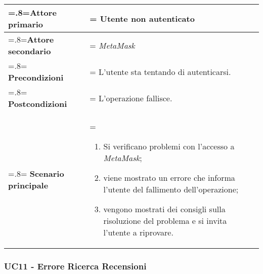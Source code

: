             \begin{center}
                \renewcommand{\arraystretch}{1.5}
                \renewcommand\tabularxcolumn[1]{m{#1}}
                \begin{tabularx}{0.9\textwidth} {
                    >{\hsize=.8\hsize\linewidth=\hsize}X
                    >{\hsize=1.2\hsize\linewidth=\hsize}X}
                    \hline
                    \textbf{Attore primario} & Utente non autenticato \\
                    \hline
                    \textbf{Attore secondario} & \textit{MetaMask} \\
                    \hline
                    \textbf{Precondizioni} & L'utente sta tentando di autenticarsi. \\
                    \hline
                    \textbf{Postcondizioni} & L'operazione fallisce. \\
                    \hline
                    \textbf{Scenario principale} &
                        \begin{enumerate}
                            \item Si verificano problemi con l'accesso a \textit{MetaMask};
                            \item viene mostrato un errore che informa l'utente del fallimento dell'operazione;
                            \item vengono mostrati dei consigli sulla risoluzione del problema e si invita
                            l'utente a riprovare.
                        \end{enumerate} \\
                    \hline
                \end{tabularx}
            \end{center}

        \subsubsection{UC11 - Errore Ricerca Recensioni}
        \label{UC11}

